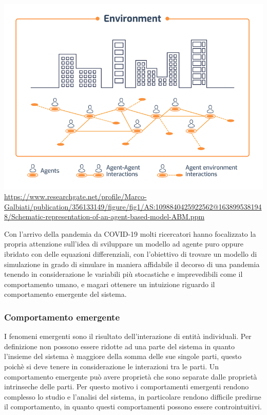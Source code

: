 \begin{minipage}{\linewidth}
    \centering
    \includegraphics[scale=0.5]{img/Schematic-representation-of-an-agent-based-model-ABM.png}
    \url{https://www.researchgate.net/profile/Marco-Galbiati/publication/356133149/figure/fig1/AS:1098840425922562@1638995381948/Schematic-representation-of-an-agent-based-model-ABM.ppm}
    \label{fig:schematic_representation_abm}
\end{minipage}

Con l'arrivo della pandemia da COVID-19 molti ricercatori hanno 
focalizzato la propria attenzione sull'idea di sviluppare un modello 
ad agente puro oppure ibridato \cite{Marzban2021-pd} con delle equazioni
differenziali, con l'obiettivo di 
trovare un modello di simulazione in grado di simulare in maniera 
affidabile il decorso di una pandemia tenendo in considerazione le 
variabili più stocastiche e imprevedibili come il comportamento umano, e 
magari ottenere un intuizione riguardo il comportamento emergente del sistema.

\subsubsection*{Comportamento emergente}
I fenomeni emergenti sono il risultato dell'interazione di entità individuali. 
Per definizione non possono essere ridotte ad una parte del sistema in quanto 
l'insieme del sistema è maggiore della somma delle sue singole parti, questo poichè 
si deve tenere in considerazione le interazioni tra le parti. Un comportamento emergente 
può avere proprietà che sono separate dalle proprietà intrinseche delle parti.
Per questo motivo i comportamenti emergenti rendono complesso lo studio e l'analisi del
sistema, in particolare rendono difficile predirne il comportamento, in quanto questi comportamenti 
possono essere controintuitivi. 


